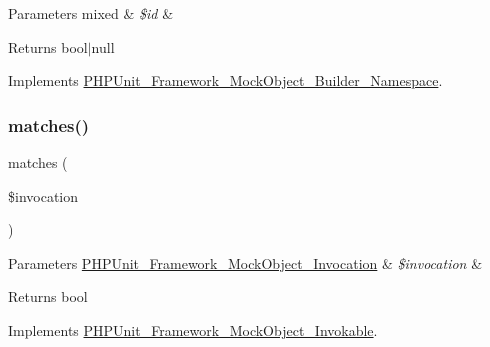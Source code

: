 \begin{DoxyParams}[1]{Parameters}
mixed & {\em \$id} & \\
\hline
\end{DoxyParams}
\begin{DoxyReturn}{Returns}
bool$\vert$null 
\end{DoxyReturn}


Implements \mbox{\hyperlink{interface_p_h_p_unit___framework___mock_object___builder___namespace_a1618f99693f7303270b2c569fdd602d4}{P\+H\+P\+Unit\+\_\+\+Framework\+\_\+\+Mock\+Object\+\_\+\+Builder\+\_\+\+Namespace}}.

\mbox{\label{class_p_h_p_unit___framework___mock_object___invocation_mocker_a4988c6fa11e275302172d0a4ae32dd3a}} 
\subsubsection{\texorpdfstring{matches()}{matches()}}
{\footnotesize\ttfamily matches (\begin{DoxyParamCaption}\item[{\mbox{\hyperlink{interface_p_h_p_unit___framework___mock_object___invocation}{P\+H\+P\+Unit\+\_\+\+Framework\+\_\+\+Mock\+Object\+\_\+\+Invocation}}}]{\$invocation }\end{DoxyParamCaption})}


\begin{DoxyParams}[1]{Parameters}
\mbox{\hyperlink{interface_p_h_p_unit___framework___mock_object___invocation}{P\+H\+P\+Unit\+\_\+\+Framework\+\_\+\+Mock\+Object\+\_\+\+Invocation}} & {\em \$invocation} & \\
\hline
\end{DoxyParams}
\begin{DoxyReturn}{Returns}
bool 
\end{DoxyReturn}


Implements \mbox{\hyperlink{interface_p_h_p_unit___framework___mock_object___invokable_a4988c6fa11e275302172d0a4ae32dd3a}{P\+H\+P\+Unit\+\_\+\+Framework\+\_\+\+Mock\+Object\+\_\+\+Invokable}}.

